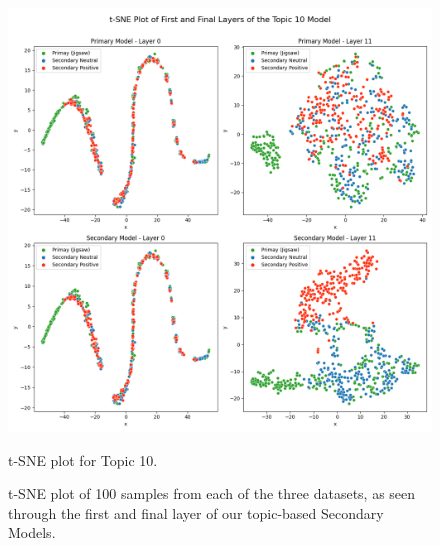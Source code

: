 \begin{figure}[ht]
    \begin{minipage}{0.49\textwidth}
        \centering
        \includegraphics[width=\linewidth]{graphs/tsne/topic_10.png}
        \caption{t-SNE plot for Topic 10.}
        \label{sub:topic10}
    \end{minipage}

    \caption{t-SNE plot of 100 samples from each of the three datasets, as seen through the first and final layer of our topic-based Secondary Models.}
    \label{fig:tsne_plots}
\end{figure}

